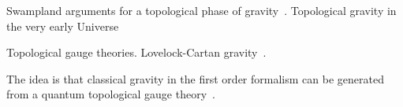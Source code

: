 \documentclass[../main.tex]{subfiles}
\begin{document}

Swampland arguments for a topological phase of gravity~\cite{agrawal2020a}.
Topological gravity in the very early Universe~\cite{kehagias2021a}

Topological gauge theories. Lovelock-Cartan gravity~\cite{mardones1991a,sadovski2017a}.

The idea is that classical gravity in the first order formalism can be generated from a quantum topological gauge theory~\cite{sako1997a,mielke2011a,fang2023a,}.
\end{document}
